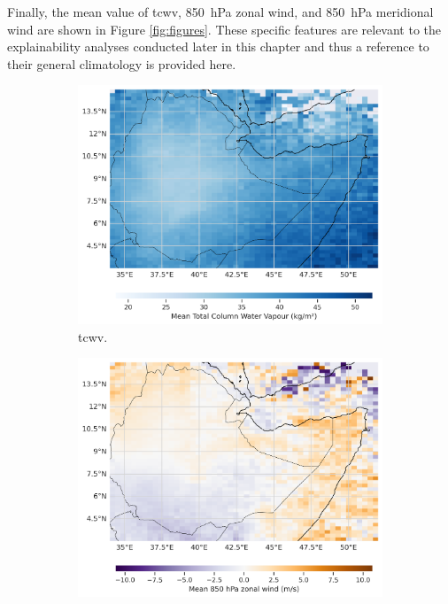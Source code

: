 Finally, the mean value of \acrshort{tcwv}, \SI{850}{\hecto\pascal} zonal wind, and \SI{850}{\hecto\pascal} meridional wind are shown in Figure \ref{fig:figures}. These specific features are relevant to the explainability analyses conducted later in this chapter and thus a reference to their general climatology is provided here.

\begin{figure}[ht]
\centering
\begin{subfigure}[t]{0.4\textwidth}
    \includegraphics[width=\textwidth]{../figures/generated/exploration/tcwv_mean_by_loc.png}
    \caption{\acrfull{tcwv}.}
    \label{fig:tcwv_mean_by_loc}
\end{subfigure}
\hfill
\begin{subfigure}[t]{0.4\textwidth}
    \includegraphics[width=\textwidth]{../figures/generated/exploration/u850_mean_by_loc.png}

\end{subfigure}
\end{figure}
